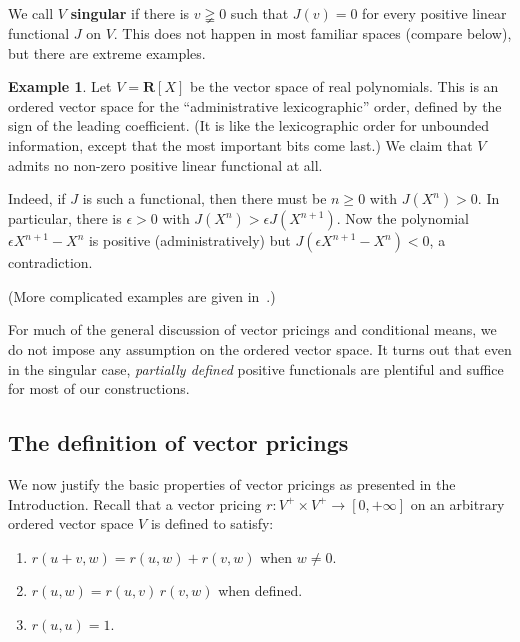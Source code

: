 \documentclass[11pt]{amsart}
\numberwithin{equation}{section}
\theoremstyle{definition}
\newtheorem{exam}[thm]{Example}
\theoremstyle{definition}
\newcommand*{\RR}{\mathbf{R}}
\begin{document}
We call $V$ \textbf{singular} if there is $v\gneqq 0$ such that $J(v)=0$ for every positive linear functional $J$ on $V$. This does not happen in most familiar spaces (compare  below), but there are extreme examples.

\begin{exam}\label{exam:singular}
Let $V=\RR[X]$ be the vector space of real polynomials. This is an ordered vector space for the ``administrative lexicographic'' order, defined by the sign of the leading coefficient. (It is like the lexicographic order for unbounded information, except that the most important bits come last.) We claim that $V$ admits no non-zero positive linear functional at all.

Indeed, if $J$ is such a functional, then there must be $n\geq 0$ with $J(X^n) >0$. In particular, there is $\epsilon>0$ with $J(X^n) > \epsilon J(X^{n+1})$. Now the polynomial $\epsilon X^{n+1} - X^n$ is positive (administratively) but $J(\epsilon X^{n+1} - X^n)<0$, a contradiction.

(More complicated examples are given in~\cite[\S 85]{ZaanenII}.)
\end{exam}

For much of the general discussion of vector pricings and conditional means, we do not impose any assumption on the ordered vector space. It turns out that even in the singular case, \emph{partially defined} positive functionals are plentiful and suffice for most of our constructions.


\subsection{The definition of vector pricings}%
We now justify the basic properties of vector pricings as presented in the Introduction. Recall that a vector pricing $r\colon V^+ \times V^+ \to [0, +\infty]$ on an arbitrary ordered vector space $V$ is defined to satisfy:

\smallskip
\begin{enumerate}[left=2\parindent, labelsep=\parindent, topsep=3pt, itemsep=3pt, label=\normalfont(VP\arabic*)]
\item $r(u+v, w) = r(u, w) + r(v, w)$ when $w\neq 0$.%
\item $ r(u,w) = r(u, v) \, r(v, w)$ when defined.%
\item $r(u,u)=1$.%
\end{enumerate}
\end{document}
